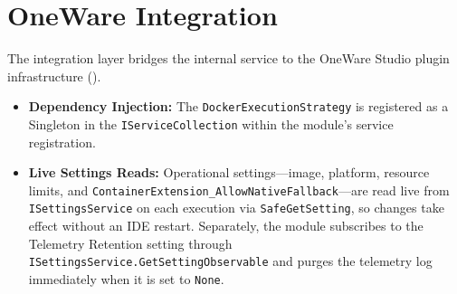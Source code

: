 \section{OneWare Integration}
The integration layer bridges the internal  service to the OneWare Studio plugin infrastructure ().
\begin{itemize}
    \item \textbf{Dependency Injection:} The \texttt{Docker\-Execution\-Strategy} is registered as a Singleton in the \texttt{IService\-Collection} within the module's service registration.
    \item \textbf{Live Settings Reads:} Operational settings---image, platform, resource limits, and \texttt{Container\-Extension\_}\allowbreak\texttt{Allow\-Native\-Fallback}---are read live from \texttt{ISettings\-Service} on each execution via \texttt{Safe\-Get\-Setting}, so changes take effect without an IDE restart. Separately, the module subscribes to the Telemetry Retention setting through \texttt{ISettings\-Service.Get\-Setting\-Observable} and purges the telemetry log immediately when it is set to \texttt{None}.
\end{itemize}


